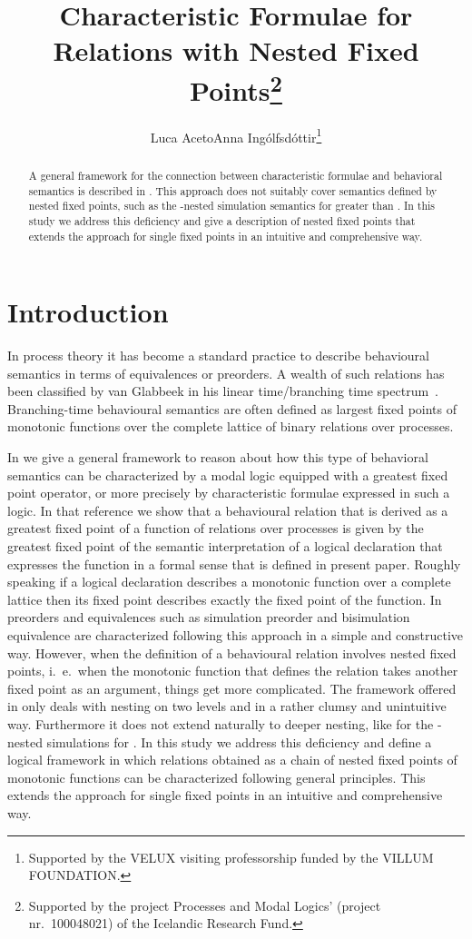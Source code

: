 \documentclass[submission]{eptcs}
\title{Characteristic Formulae for Relations with Nested Fixed
  Points\thanks{Supported by the project Processes and Modal Logics'
    (project nr.~100048021) of the Icelandic Research Fund.} }
\author{Luca Aceto\quad Anna Ing\'olfsd\'ottir\thanks{Supported by the
    VELUX visiting professorship funded by the VILLUM FOUNDATION.}
  \institute{ICE-TCS, School of Computer Science\\Reykjavik University \\
    Reykjavik, Iceland} \email{\quad luca,annai@ru.is}}
\begin{document}
\maketitle
\begin{abstract}
  A general framework for the connection between characteristic
  formulae and behavioral semantics is described in
  \cite{AILS2011}. This approach does not suitably cover semantics
  defined by nested fixed points, such as the -nested simulation
  semantics for  greater than . In this study we address this
  deficiency and give a description of nested fixed points that
  extends the approach for single fixed points in an intuitive and
  comprehensive way.
\end{abstract}          

\section{Introduction}
In process theory it has become a standard practice to describe
behavioural semantics in terms of equivalences or preorders. A wealth
of such relations has been classified by van Glabbeek in his linear
time/branching time spectrum~\cite{vG2001}. Branching-time behavioural
semantics are often defined as largest fixed points of monotonic
functions over the complete lattice of binary relations over
processes.

In \cite{AILS2011} we give a general framework to reason about how
this type of behavioral semantics can be characterized by a modal
logic equipped with a greatest fixed point operator, or more precisely
by characteristic formulae expressed in such a logic. In that
reference we show that a behavioural relation that is derived as a
greatest fixed point of a function of relations over processes is
given by the greatest fixed point of the semantic interpretation of a
logical declaration that expresses the function in a formal sense that
is defined in present paper.  Roughly speaking if a logical
declaration describes a monotonic function over a complete lattice
then its fixed point describes exactly the fixed point of the
function. In \cite{AILS2011} preorders and equivalences such as simulation preorder
and bisimulation equivalence are characterized following this approach
in a simple and constructive way. However, when the definition of a
behavioural relation involves nested fixed points, i.~e.~when the
monotonic function that defines the relation takes another fixed point
as an argument, things get more complicated.  The framework offered in
\cite{AILS2011} only deals with nesting on two levels and in a rather
clumsy and unintuitive way. Furthermore it does not extend naturally
to deeper nesting, like for the -nested simulations for . In
this study we address this deficiency and define a logical framework
in which relations obtained as a chain of nested fixed points of
monotonic functions can be characterized following general
principles. This extends the approach for single fixed points in an
intuitive and comprehensive way.
\end{document}
